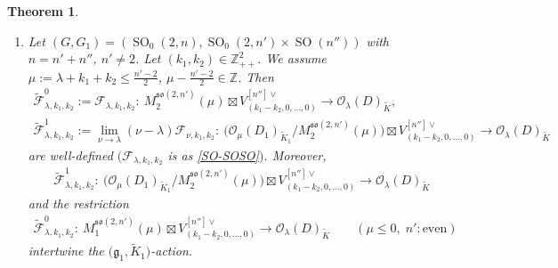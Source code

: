 \documentclass[pdftex]{sigma}
\numberwithin{equation}{section}
\newtheorem{Theorem}{Theorem}[section]
\newcommand{\BZ}{\mathbb{Z}}
\newcommand{\fg}{\mathfrak{g}}
\newcommand{\cF}{\mathcal{F}}
\newcommand{\cO}{\mathcal{O}}
\begin{document}
\begin{Theorem}
\begin{enumerate}
We assume $\mu:=\lambda+2k\in\BZ+\frac{1}{2}$, $\mu\le \big\lfloor \frac{s}{2}\big\rfloor-\frac{3}{2}$.
Let $\max\big\{0,\mu+\frac{1}{2}\big\}\le i\le \big\lfloor\frac{s}{2}\big\rfloor$. Then
\begin{gather*} \tilde{\cF}_{\lambda,k}^i:=\lim_{\nu\to\lambda} (\nu-\lambda)^{i-\max\left\{0,\mu+\frac{1}{2}\right\}}\cF_{\nu,k}
\colon \ M_{i+1}^{\fg_1}(2\mu)/M_{i}^{\fg_1}(2\mu)\longrightarrow \cO_\lambda(D)_{\tilde{K}} \end{gather*}
is well-defined $(\cF_{\lambda,k}$ is as \eqref{SU-SO*}$)$. Moreover,
\begin{gather*} \tilde{\cF}_{\lambda,k,l}^{\lfloor s/2\rfloor}\colon \
\cO_{2\mu}(D_1)_{\tilde{K}_1}/M_{\left\lfloor\frac{s}{2}\right\rfloor}^{\fg_1}(2\mu)\longrightarrow \cO_\lambda(D)_{\tilde{K}} \end{gather*}
intertwines the $\big(\fg_1,\tilde{K}_1\big)$-action.
\item[$(5)$] Let $(G,G_1)=(\operatorname{SO}_0(2,n),\operatorname{SO}_0(2,n')\times \operatorname{SO}(n''))$ with $n=n'+n''$, $n'\ne 2$. Let $(k_1,k_2)\in\BZ_{++}^2$.
We assume $\mu:=\lambda+k_1+k_2\le \frac{n'-2}{2}$, $\mu-\frac{n'-2}{2}\in\BZ$. Then
\begin{gather*} \tilde{\cF}_{\lambda,k_1,k_2}^0:=\cF_{\lambda,k_1,k_2}
\colon \ M_2^{\mathfrak{so}(2,n')}(\mu)\boxtimes V_{(k_1-k_2,0,\ldots,0)}^{[n'']\vee}\longrightarrow \cO_\lambda(D)_{\tilde{K}},\\
 \tilde{\cF}_{\lambda,k_1,k_2}^1:=\lim_{\nu\to\lambda} (\nu-\lambda)\cF_{\nu,k_1,k_2}
\colon \ \!\big(\cO_\mu(D_1)_{\tilde{K}_1}\!/M_2^{\mathfrak{so}(2,n')}(\mu)\big)\boxtimes V_{(k_1{-}k_2,0,\ldots,0)}^{[n'']\vee}\!\longrightarrow\! \cO_\lambda(D)_{\tilde{K}}\! \end{gather*}
are well-defined $(\cF_{\lambda,k_1,k_2}$ is as \eqref{SO-SOSO}$)$. Moreover,
\begin{gather*} \tilde{\cF}_{\lambda,k_1,k_2}^1\colon \ \big(\cO_\mu(D_1)_{\tilde{K}_1}/M_2^{\mathfrak{so}(2,n')}(\mu)\big)\boxtimes V_{(k_1-k_2,0,\ldots,0)}^{[n'']\vee}
\longrightarrow \cO_\lambda(D)_{\tilde{K}} \end{gather*}
and the restriction
\begin{gather*} \tilde{\cF}_{\lambda,k_1,k_2}^0\colon \ M_1^{\mathfrak{so}(2,n')}(\mu)\boxtimes V_{(k_1-k_2,0,\ldots,0)}^{[n'']\vee}\longrightarrow \cO_\lambda(D)_{\tilde{K}}
\qquad \left(\mu\le 0, \;n'\colon \text{even}\right) \end{gather*}
intertwine the $\big(\fg_1,\tilde{K}_1\big)$-action.
\end{enumerate}
\end{Theorem}
\end{document}
